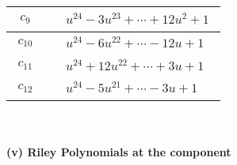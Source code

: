 \documentclass[1p]{elsarticle_modified}
\theoremstyle{definition}
\begin{document}
\begin{tabular}{m{50pt}|m{274pt}}
\hline $$\begin{aligned}c_{9}\end{aligned}$$&$\begin{aligned}
&u^{24}-3 u^{23}+\cdots+12 u^2+1
\end{aligned}$\\
\hline $$\begin{aligned}c_{10}\end{aligned}$$&$\begin{aligned}
&u^{24}-6 u^{22}+\cdots-12 u+1
\end{aligned}$\\
\hline $$\begin{aligned}c_{11}\end{aligned}$$&$\begin{aligned}
&u^{24}+12 u^{22}+\cdots+3 u+1
\end{aligned}$\\
\hline $$\begin{aligned}c_{12}\end{aligned}$$&$\begin{aligned}
&u^{24}-5 u^{21}+\cdots-3 u+1
\end{aligned}$\\
\hline
\end{tabular}\\~\\
\newpage\renewcommand{\arraystretch}{1}
\flushleft \textbf{(v) Riley Polynomials at the component}\newline \\
\end{document}
